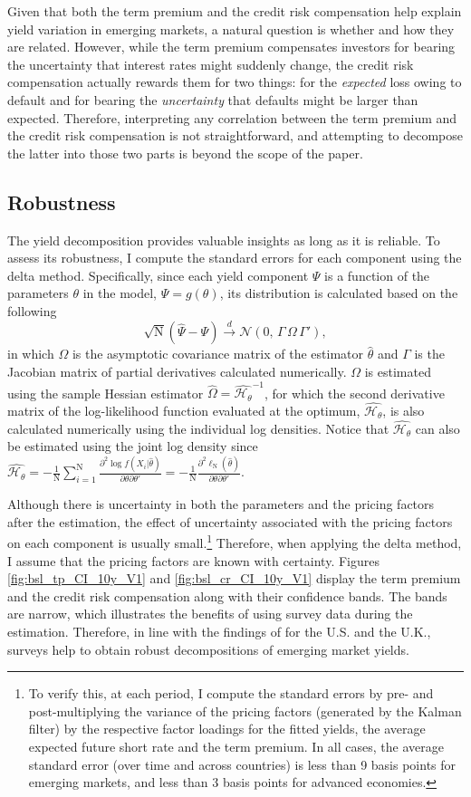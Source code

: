 \documentclass[a4paper, 12pt]{article}
\providecommand{\Ydim}{\mathrm{N}}
\providecommand{\Normal}{\mathcal{N}}
\providecommand{\params}{\theta}
\providecommand{\Vasy}{\Omega}
\providecommand{\cmpnt}{\Psi}
\providecommand{\Jacobian}{\Gamma}
\providecommand{\Hessian}{\mathcal{H}_\params}
\providecommand{\asydstr}{\sqrt{\Ydim} \left( \widehat{\cmpnt} - \cmpnt \right) \xrightarrow[]{d} \Normal \left(0,\, \Jacobian \, \Vasy \, \Jacobian' \right)}
\providecommand{\sampleHjoint}{\frac{1}{\Ydim} \frac{\partial^{2} \ell_{\Ydim} (\widehat{\params})}{\partial \params \partial \params'}}
\providecommand{\sampleHindiv}{\frac{1}{\Ydim} \sum_{i = 1}^{\Ydim} \frac{\partial^{2} \log \mathit{f} (X_{i} | \widehat{\params})}{\partial \params \partial \params'}}
\begin{document}
\begin{appendices}
	Given that both the term premium and the credit risk compensation help explain yield variation in emerging markets, a natural question is whether and how they are related. However, while the term premium compensates investors for bearing the uncertainty that interest rates might suddenly change, the credit risk compensation actually rewards them for two things: for the \textit{expected} loss owing to default and for bearing the \textit{uncertainty} that defaults might be larger than expected. Therefore, interpreting any correlation between the term premium and the credit risk compensation is not straightforward, and attempting to decompose the latter into those two parts is beyond the scope of the paper. 
	
	\subsection{Robustness}
	The yield decomposition provides valuable insights as long as it is reliable. To assess its robustness, I compute the standard errors for each component using the delta method. Specifically, since each yield component \(\cmpnt\) is a function of the parameters \(\theta\) in the model, \(\cmpnt = g(\params) \), its distribution is calculated based on the following
	\begin{equation*}
	\asydstr ,
	\end{equation*}
	in which \(\Vasy\) is the asymptotic covariance matrix of the estimator \(\widehat{\params}\) and \(\Jacobian\) is the Jacobian matrix of partial derivatives calculated numerically. \(\Vasy\) is estimated using the sample Hessian estimator \(\widehat{\Vasy} = \widehat{\Hessian}^{-1} \), for which the second derivative matrix of the log-likelihood function evaluated at the optimum, \(\widehat{\Hessian}\), is also calculated numerically using the individual log densities. Notice that \(\widehat{\Hessian}\) can also be estimated using the joint log density since \(\widehat{\Hessian} = - \sampleHindiv = - \sampleHjoint\). 
	
	Although there is uncertainty in both the parameters and the pricing factors after the estimation, the effect of uncertainty associated with the pricing factors on each component is usually small.\footnote{ To verify this, at each period, I compute the standard errors by pre- and post-multiplying the variance of the pricing factors (generated by the Kalman filter) by the respective factor loadings for the fitted yields, the average expected future short rate and the term premium. In all cases, the average standard error (over time and across countries) is less than 9 basis points for emerging markets, and less than 3 basis points for advanced economies.} Therefore, when applying the delta method, I assume that the pricing factors are known with certainty. Figures \ref{fig:bsl_tp_CI_10y_V1} and \ref{fig:bsl_cr_CI_10y_V1} display the term premium and the credit risk compensation along with their confidence bands. The bands are narrow, which illustrates the benefits of using survey data during the estimation. Therefore, in line with the findings of \cite{Guimaraes:2014} for the U.S. and the U.K., surveys help to obtain robust decompositions of emerging market yields.
	

\end{appendices}
\end{document}

